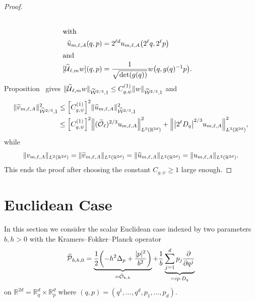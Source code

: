 \documentclass[10pt]{amsart}
\theoremstyle{definition}\newtheorem{defi}[theo]{Definition}\newtheorem{rema}[theo]{Remark}\newtheorem{exam}[theo]{Example}\newtheorem{exem}[theo]{Example}\newtheorem{nota}[theo]{Notation}
\newcommand{\R}{\mathbb{R}}
\newcommand{\clW}{\mathcal{W}}
\newcommand{\clO}{\mathcal{O}}
\newcommand{\clP}{\mathcal{P}}
\newcommand{\clU}{\mathcal{U}}
\let\oldtilde\tilde
\renewcommand*{\tilde}[1]{\mathchoice{\widetilde{#1}}{\widetilde{#1}}{\oldtilde{#1}}{\oldtilde{#1}}}
\let\oldhat\hat
\renewcommand*{\hat}[1]{\mathchoice{\widehat{#1}}{\widehat{#1}}{\oldhat{#1}}{\oldhat{#1}}}
\let\originalleft\left
\let\originalright\right
\renewcommand{\left}{\mathopen{}\mathclose\bgroup\originalleft}
\renewcommand{\right}{\aftergroup\egroup\originalright}
\begin{document}
\begin{proof}
\begin{align*}
\\
\intertext{with}
\hat{u}_{m,\ell,A}(q, p) &= 2^{\ell d}u_{m,\ell,A}\left(2^{\ell}q,2^{\ell}p\right)\\
\intertext{and}
[\hat{\clU}_{\ell,m}w](q,p)&=\frac{1}{\sqrt{\det (g(q))}} w\left(q,g(q)^{-1}p\right).
\end{align*}
Proposition~\label{pr:Wsplatchange}
gives $\|\hat{\clU}_{\ell,m}w\|_{\widetilde{\clW}^{2/3},1}\leq C_{g,\psi}^{(1)} \|w\|_{\widetilde{\clW}^{2/3},1}$ and
\begin{align*}
\|\tilde{v}_{m,\ell,A}\|_{\widetilde{\clW}^{2/3},1}^2 &\leq \left[C_{g,\psi}^{(1)}\right]^2 \|\hat{u}_{m,\ell,A}\|_{\widetilde{\clW}^{2/3},1}^2
\\
&\leq \left[C_{g,\psi}^{(1)}\right]^2 \left\|(\tilde{\clO}_{\ell})^{2/3}u_{m,\ell,A}\right\|_{L^2(\R^{2d})}^2 + \left\|\left|2^{\ell}D_q\right|^{2/3}u_{m,\ell,A}\right\|_{L^2(\R^{2d})}^2,
\end{align*}
while
\[
\|v_{m,\ell,A}\|_{L^2(\R^{2d})}=\|\tilde{v}_{m,\ell,A}\|_{L^2(\R^{2d})}=\|\hat{u}_{m,\ell,A}\|_{L^2(\R^{2d})}=\|u_{m,\ell,A}\|_{L^2(\R^{2d})}.
\]
This ends the proof after choosing the constant $C_{g,\psi}\geq 1$ large enough.
\end{proof}

\section{Euclidean Case}\label{sec:EuclCase}

In this section we consider the scalar Euclidean case indexed by two parameters $b,h>0$ with the Kramers--Fokker--Planck operator
\begin{equation}
\hat{\clP}_{b,h,0}=\underbrace{\frac{1}{2}\left(-h^2\Delta_{p} + \frac{|p|^{2}}{b^2}\right)}_{=\hat{\clO}_{b,h}} + \frac{1}{b}\underbrace{\sum_{j=1}^{d} p_{j}\frac{\partial}{\partial q^{j}}}_{=i p\cdot D_q}
\end{equation}
on $\R^{2d} = \R^d_q \times \R^d_p$ where $(q,p) = (q^1, \dots, q^d, p_1, \dots, p_d)$.
\end{document}
